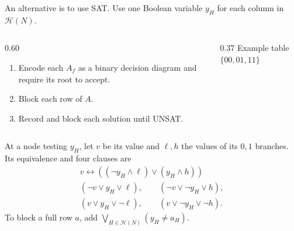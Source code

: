 \documentclass{beamer}
\newcommand{\HH}{\mathcal H}
\begin{document}
\begin{frame}
  An alternative is to use SAT. Use one Boolean variable $y_H$ for
  each column in $\HH(N)$.
  \begin{columns}[T,onlytextwidth]
    \begin{column}{0.60\textwidth}
      \begin{enumerate}
        \item Encode each $A_f$ as a binary decision diagram and
          require its root to accept.
        \item Block each row of $A$.
        \item Record and block each solution until UNSAT.
      \end{enumerate}
    \end{column}
    \begin{column}{0.37\textwidth}
      \centering
      \small Example table $\{00,01,11\}$

    \end{column}
  \end{columns}

  \medskip
  At a node testing $y_H$, let $v$ be its value and $\ell,h$ the
  values of its $0,1$ branches. Its equivalence and four clauses are
  \[
    \begin{gathered}
      v\leftrightarrow((\neg y_H\land\ell)\lor(y_H\land h))\\[3pt]
      (\neg v\lor y_H\lor\ell),\qquad(\neg v\lor\neg y_H\lor h),\\
      (v\lor y_H\lor\neg\ell),\qquad(v\lor\neg y_H\lor\neg h).
    \end{gathered}
  \]
  To block a full row $a$, add $\bigvee_{H\in\HH(N)}(y_H\ne a_H)$.
\end{frame}
\end{document}
